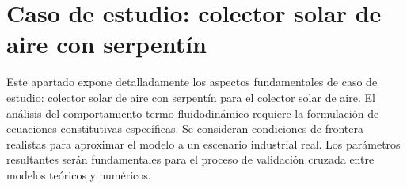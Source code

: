 \section{Caso de estudio: colector solar de aire con serpentín}
\label{sec:cap04_caso_estudio}

Este apartado expone detalladamente los aspectos fundamentales de caso de estudio: colector solar de aire con serpentín para el colector solar de aire.
El análisis del comportamiento termo-fluidodinámico requiere la formulación de ecuaciones constitutivas específicas.
Se consideran condiciones de frontera realistas para aproximar el modelo a un escenario industrial real.
Los parámetros resultantes serán fundamentales para el proceso de validación cruzada entre modelos teóricos y numéricos.
